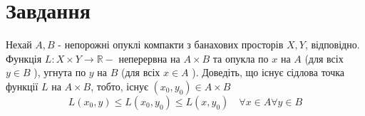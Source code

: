 
\chapter{Завдання \theHchapter}

\begin{tcolorbox}[title=Завдання]
    Нехай $A, B$ - непорожні опуклі компакти з банахових просторів $X, Y$, 
    відповідно. 
    Функція $L: X \times Y \rightarrow \mathbb{R}-$ 
    неперервна на $A \times B$ та 
    опукла по $x$ на $A$ (для всіх $y \in B$ ), 
    угнута по $y$ на $B$ (для всіх $x \in A$ ). 
    Доведіть, що існує сідлова точка функції $L$ на $A \times B$, 
    тобто, існує $\left(x_{0}, y_{0}\right) \in A \times B$
    $$L\left(x_{0}, y\right) \leq L\left(x_{0}, y_{0}\right) 
    \leq L\left(x, y_{0}\right) \quad \forall x \in A \forall y \in B$$
\end{tcolorbox}



